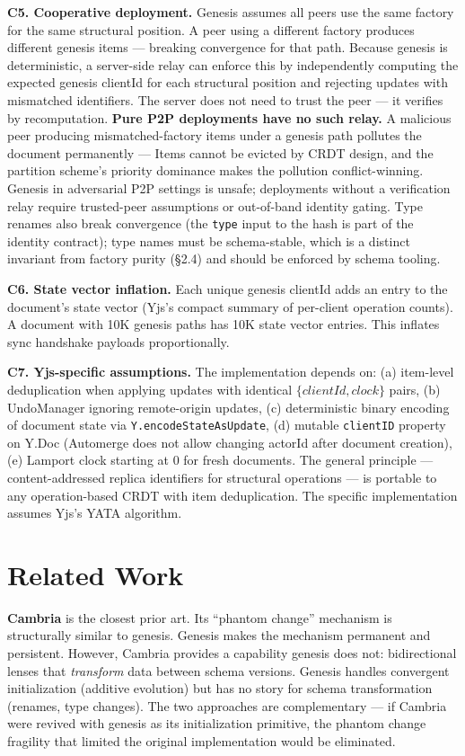 \textbf{C5. Cooperative deployment.} Genesis assumes all peers use the same factory for the same structural position. A peer using a different factory produces different genesis items --- breaking convergence for that path. Because genesis is deterministic, a server-side relay can enforce this by independently computing the expected genesis clientId for each structural position and rejecting updates with mismatched identifiers. The server does not need to trust the peer --- it verifies by recomputation. \textbf{Pure P2P deployments have no such relay.} A malicious peer producing mismatched-factory items under a genesis path pollutes the document permanently --- Items cannot be evicted by CRDT design, and the partition scheme's priority dominance\cite{plexus:partitioning} makes the pollution conflict-winning. Genesis in adversarial P2P settings is unsafe; deployments without a verification relay require trusted-peer assumptions or out-of-band identity gating. Type renames also break convergence (the \texttt{type} input to the hash is part of the identity contract); type names must be schema-stable, which is a distinct invariant from factory purity (\S2.4) and should be enforced by schema tooling.

\textbf{C6. State vector inflation.} Each unique genesis clientId adds an entry to the document's state vector (Yjs's compact summary of per-client operation counts). A document with 10K genesis paths has 10K state vector entries. This inflates sync handshake payloads proportionally.

\textbf{C7. Yjs-specific assumptions.} The implementation depends on: (a) item-level deduplication when applying updates with identical $\{\mathit{clientId}, \mathit{clock}\}$ pairs\cite{yata2016}, (b) UndoManager ignoring remote-origin updates\cite{yata2016}, (c) deterministic binary encoding of document state via \texttt{Y.encodeStateAsUpdate}, (d) mutable \texttt{clientID} property on Y.Doc (Automerge does not allow changing actorId after document creation), (e) Lamport clock starting at 0 for fresh documents. The general principle --- content-addressed replica identifiers for structural operations --- is portable to any operation-based CRDT with item deduplication. The specific implementation assumes Yjs's YATA algorithm.

\section{Related Work}

\textbf{Cambria}\cite{cambria2021} is the closest prior art. Its ``phantom change'' mechanism is structurally similar to genesis. Genesis makes the mechanism permanent and persistent. However, Cambria provides a capability genesis does not: bidirectional lenses that \emph{transform} data between schema versions. Genesis handles convergent initialization (additive evolution) but has no story for schema transformation (renames, type changes). The two approaches are complementary --- if Cambria were revived with genesis as its initialization primitive, the phantom change fragility that limited the original implementation would be eliminated.

